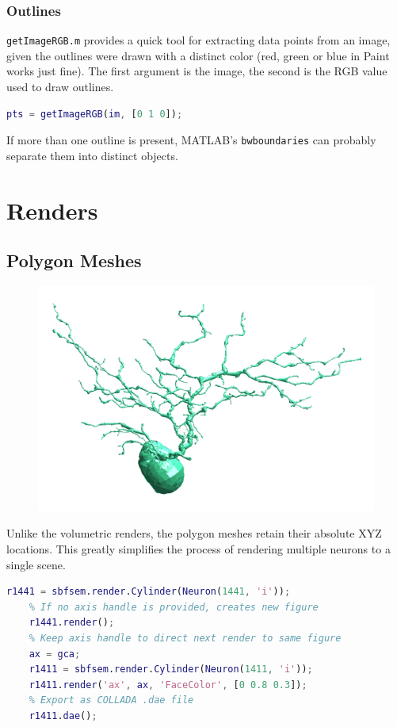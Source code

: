 \documentclass[12pt]{exam}
\begin{document}
	\subsubsection{Outlines}
	\texttt{getImageRGB.m} provides a quick tool for extracting data points from an image, given the outlines were drawn with a distinct color (red, green or blue in Paint works just fine). The first argument is the image, the second is the RGB value used to draw outlines.
	\begin{lstlisting}[language=matlab]
	pts = getImageRGB(im, [0 1 0]);
	\end{lstlisting}
	If more than one outline is present, MATLAB's \texttt{bwboundaries} can probably separate them into distinct objects.
	
	\section{Renders}
	\subsection{Polygon Meshes}
	\begin{figure}
		\includegraphics[width=\linewidth]{c6_render}
		\label{c6render}
	\end{figure}
	Unlike the volumetric renders, the polygon meshes retain their absolute XYZ locations. This greatly simplifies the process of rendering multiple neurons to a single scene.
	\begin{lstlisting}[language=matlab]
	r1441 = sbfsem.render.Cylinder(Neuron(1441, 'i'));
	% If no axis handle is provided, creates new figure
	r1441.render();
	% Keep axis handle to direct next render to same figure
	ax = gca; 
	r1411 = sbfsem.render.Cylinder(Neuron(1411, 'i'));
	r1411.render('ax', ax, 'FaceColor', [0 0.8 0.3]);
	% Export as COLLADA .dae file
	r1411.dae();\end{lstlisting}
\end{document}
